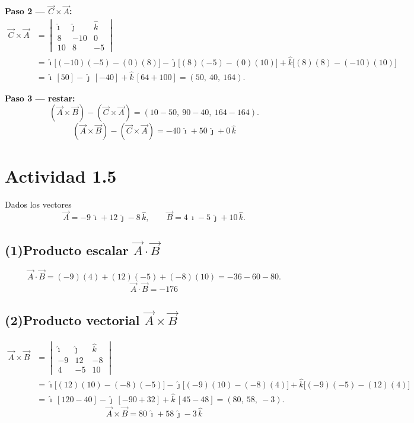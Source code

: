 \documentclass[12pt,letterpaper]{article}
\newcommand{\ii}{\hat{\imath}}
\newcommand{\jj}{\hat{\jmath}}
\newcommand{\kk}{\hat{k}}
\begin{document}
\noindent\textbf{Paso 2 — $\vec{C}\times\vec{A}$:}
\begin{align*}
    \vec{C}\times\vec{A}
    &= \begin{vmatrix} \ii & \jj & \kk \\ 8 & -10 & 0 \\ 10 & 8 & -5 \end{vmatrix}\\[2pt]
    &= \ii\big[(-10)(-5)-(0)(8)\big] - \jj\big[(8)(-5)-(0)(10)\big] + \kk\big[(8)(8)-(-10)(10)\big]\\
    &= \ii\,[50] - \jj\,[-40] + \kk\,[64+100]
     = (50,\ 40,\ 164).
\end{align*}

\noindent\textbf{Paso 3 — restar:}
\[
    (\vec{A}\times\vec{B}) - (\vec{C}\times\vec{A})
    = (10-50,\ 90-40,\ 164-164).
\]
\[
    \boxed{(\vec{A}\times\vec{B}) - (\vec{C}\times\vec{A}) = -40\,\ii + 50\,\jj + 0\,\kk}
\]

\newpage

\section*{Actividad 1.5}

\noindent Dados los vectores
\[
    \vec{A} = -9\,\ii + 12\,\jj - 8\,\kk,\qquad
    \vec{B} = 4\,\ii - 5\,\jj + 10\,\kk.
\]

\subsection*{(1)\quad Producto escalar $\vec{A}\cdot\vec{B}$}
\[
    \vec{A}\cdot\vec{B} = (-9)(4) + (12)(-5) + (-8)(10) = -36 - 60 - 80.
\]
\[
    \boxed{\vec{A}\cdot\vec{B} = -176}
\]

\subsection*{(2)\quad Producto vectorial $\vec{A}\times\vec{B}$}
\begin{align*}
    \vec{A}\times\vec{B}
    &= \begin{vmatrix} \ii & \jj & \kk \\ -9 & 12 & -8 \\ 4 & -5 & 10 \end{vmatrix}\\[2pt]
    &= \ii\big[(12)(10)-(-8)(-5)\big] - \jj\big[(-9)(10)-(-8)(4)\big] + \kk\big[(-9)(-5)-(12)(4)\big]\\
    &= \ii\,[120-40] - \jj\,[-90+32] + \kk\,[45-48]
     = (80,\ 58,\ -3).
\end{align*}
\[
    \boxed{\vec{A}\times\vec{B} = 80\,\ii + 58\,\jj - 3\,\kk}
\]
\end{document}

